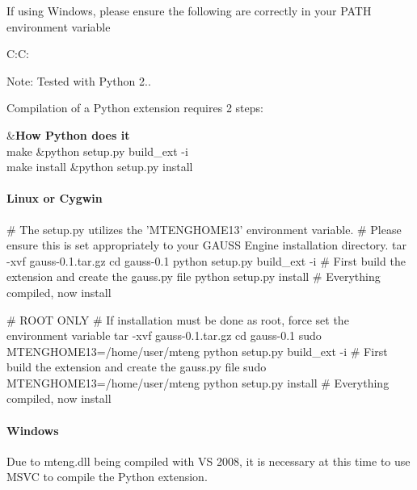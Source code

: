 If using Windows, please ensure the following are correctly in your {\ttfamily P\-A\-T\-H} environment variable \begin{DoxyVerb}C:\;C:\Scripts\
\end{DoxyVerb}


Note\-: Tested with Python 2..

Compilation of a Python extension requires 2 steps\-:

\begin{TabularC}{2}
\hline
{}&{\bf How Python does it}\\
{\ttfamily make} &{\ttfamily python setup.\-py build\-\_\-ext -\/i} \\
{\ttfamily make install} &{\ttfamily python setup.\-py install} \\\cline{1-2}
\end{TabularC}


\paragraph*{Linux or Cygwin}


\begin{DoxyCode}
\textcolor{preprocessor}{# The setup.py utilizes the 'MTENGHOME13' environment variable.}
\textcolor{preprocessor}{}\textcolor{preprocessor}{# Please ensure this is set appropriately to your GAUSS Engine installation directory.}
\textcolor{preprocessor}{}tar -xvf gauss-0.1.tar.gz
cd gauss-0.1
python setup.py build\_ext -i      # First build the extension and create the gauss.py file
python setup.py install           # Everything compiled, now install

\textcolor{preprocessor}{# ROOT ONLY}
\textcolor{preprocessor}{}\textcolor{preprocessor}{# If installation must be done as root, force set the environment variable}
\textcolor{preprocessor}{}tar -xvf gauss-0.1.tar.gz
cd gauss-0.1
sudo MTENGHOME13=/home/user/mteng python setup.py build\_ext -i      # First build the extension and create 
      the gauss.py file
sudo MTENGHOME13=/home/user/mteng python setup.py install           # Everything compiled, now install
\end{DoxyCode}


\paragraph*{Windows}

Due to {\ttfamily mteng.\-dll} being compiled with V\-S 2008, it is necessary at this time to use M\-S\-V\-C to compile the Python extension.

